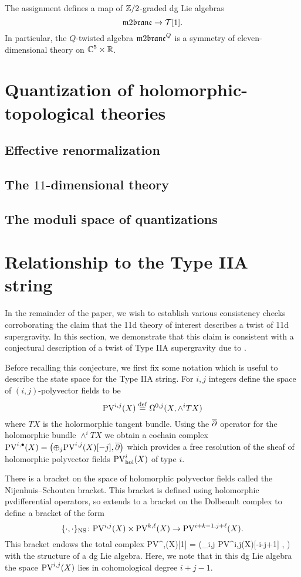 \documentclass[11pt]{amsart}
\def\pv{{\rm PV}}
\def\PV{{\rm PV}}
\begin{document}
\begin{prop}
The assignment
 defines a map of $\mathbb Z/2$-graded dg Lie algebras 
\[
\m2 \to \cT[1] .
\]
In particular, the $Q$-twisted algebra $\m2^Q$ is a symmetry of eleven-dimensional theory on $\mathbb C^5 \times \mathbb R$. 
\end{prop}


\section{Quantization of holomorphic-topological theories}
\label{sec:org297a559}
\subsection{Effective renormalization}
\label{sec:orga5cd4ed}
\subsection{The \(11\)-dimensional theory}
\label{sec:org8b189fc}
\subsection{The moduli space of quantizations}
\label{sec:orgf278b4e}
\section{Relationship to the Type IIA string}
\label{sec:org355a726}
In the remainder of the paper, we wish to establish various consistency checks corroborating the claim that the 11d theory of interest describes a twist of 11d supergravity. In this section, we demonstrate that this claim is consistent with a conjectural description of a twist of Type IIA supergravity due to \cite{CLsugra}.

Before recalling this conjecture, we first fix some notation which is useful to describe the state space for the Type IIA string. 
For $i,j$ integers define the space of $(i,j)$-polyvector fields to be
\[
  \pv^{i,j}(X) \define \Omega^{0,j}(X, \wedge^{i} TX)
\]
where $TX$ is the holormorphic tangent bundle.
Using the $\overline{\partial}$ operator for the holomorphic bundle $\wedge^{i}TX$ we obtain a cochain complex $\pv^{i,\bu}(X) = \left(\oplus_{j} \pv^{i,j}(X) [-j], \dbar \right)$ which provides a free resolution of the sheaf of holomorphic polyvector fields $\PV^{i}_{\rm hol}(X)$ of type $i$.

There is a bracket on the space of holomorphic polyvector fields called the Nijenhuis--Schouten bracket.
This bracket is defined using holomorphic pvdifferential operators, so extends to a bracket on the Dolbeault complex to define a bracket of the form
\[
  \{\cdot, \cdot\}_{\rm NS} \colon \pv^{i,j}(X) \times \pv^{k,\ell}(X) \to \PV^{i+k-1, j+\ell}(X) .
\]
This bracket endows the total complex
\beqn\label{eqn:pvlie1}
\pv^{\bu,\bu}(X)[1] = \left(\oplus_{i,j} \pv^{i,j}(X)[-i-j+1] , \dbar \right)
\eeqn
with the structure of a dg Lie algebra.
Here, we note that in this dg Lie algebra the space $\pv^{i,j}(X)$ lies in cohomological degree $i+j-1$.
\end{document}
